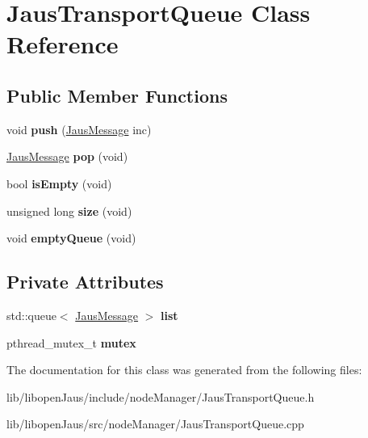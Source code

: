 \hypertarget{class_jaus_transport_queue}{\section{\-Jaus\-Transport\-Queue \-Class \-Reference}
\label{class_jaus_transport_queue}
}
\subsection*{\-Public \-Member \-Functions}
\begin{DoxyCompactItemize}
\item 
\hypertarget{class_jaus_transport_queue_a66427a3e92c4e0ef8153bd3c4039395c}{void {\bfseries push} (\hyperlink{struct_jaus_message_struct}{\-Jaus\-Message} inc)}\label{class_jaus_transport_queue_a66427a3e92c4e0ef8153bd3c4039395c}

\item 
\hypertarget{class_jaus_transport_queue_a7d63f0e06e89bc3333a3d02e62c21535}{\hyperlink{struct_jaus_message_struct}{\-Jaus\-Message} {\bfseries pop} (void)}\label{class_jaus_transport_queue_a7d63f0e06e89bc3333a3d02e62c21535}

\item 
\hypertarget{class_jaus_transport_queue_a653189409c12804a6f0ab54b7c2b3b8e}{bool {\bfseries is\-Empty} (void)}\label{class_jaus_transport_queue_a653189409c12804a6f0ab54b7c2b3b8e}

\item 
\hypertarget{class_jaus_transport_queue_a0367f25fdcce64eb33da69f638908903}{unsigned long {\bfseries size} (void)}\label{class_jaus_transport_queue_a0367f25fdcce64eb33da69f638908903}

\item 
\hypertarget{class_jaus_transport_queue_aee3453b8c6e1866c3db2d6085c8baa73}{void {\bfseries empty\-Queue} (void)}\label{class_jaus_transport_queue_aee3453b8c6e1866c3db2d6085c8baa73}

\end{DoxyCompactItemize}
\subsection*{\-Private \-Attributes}
\begin{DoxyCompactItemize}
\item 
\hypertarget{class_jaus_transport_queue_afe9368087ebed39c90df7a5e454319de}{std\-::queue$<$ \hyperlink{struct_jaus_message_struct}{\-Jaus\-Message} $>$ {\bfseries list}}\label{class_jaus_transport_queue_afe9368087ebed39c90df7a5e454319de}

\item 
\hypertarget{class_jaus_transport_queue_afd95d65abc58f791e58f03398b2a4c30}{pthread\-\_\-mutex\-\_\-t {\bfseries mutex}}\label{class_jaus_transport_queue_afd95d65abc58f791e58f03398b2a4c30}

\end{DoxyCompactItemize}


\-The documentation for this class was generated from the following files\-:\begin{DoxyCompactItemize}
\item 
lib/libopen\-Jaus/include/node\-Manager/\-Jaus\-Transport\-Queue.\-h\item 
lib/libopen\-Jaus/src/node\-Manager/\-Jaus\-Transport\-Queue.\-cpp\end{DoxyCompactItemize}
